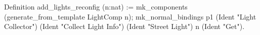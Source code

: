 Definition add_lights_reconfig (n:nat) :=
 mk_components (generate_from_template LightComp n);
 mk_normal_bindings p1 
            (Ident "Light Collector") (Ident "Collect Light Info")
            (Ident "Street Light")  n (Ident "Get").